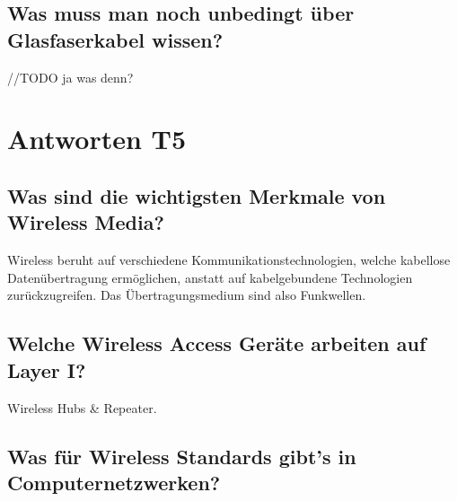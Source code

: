 \subsection*{Was muss man noch unbedingt über Glasfaserkabel wissen?}
//TODO ja was denn?

\section{Antworten T5}
\subsection*{Was sind die wichtigsten Merkmale von \flqq{}Wireless Media\frqq?}
Wireless beruht auf verschiedene Kommunikationstechnologien, welche kabellose Datenübertragung ermöglichen, anstatt auf kabelgebundene Technologien zurückzugreifen. Das Übertragungsmedium sind also Funkwellen.

\subsection*{Welche Wireless Access Geräte arbeiten auf Layer I?}
Wireless Hubs \& Repeater.

\subsection*{Was für Wireless Standards gibt's in Computernetzwerken?}
\begin{table}[H]
\label{tab:WirelessStandards}
\caption{Wireless Standards und Merkmale}
\end{table}

